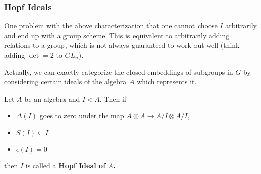 \documentclass[12pt]{article}
\theoremstyle{nonumberbreak}
\theoremstyle{changebreak}
\theoremstyle{nonumberbreak}
\begin{document}
\subsubsection{Hopf Ideals}
One problem with the above characterization that one cannot choose $I$ arbitrarily and end
up with a group scheme. This is equivalent to arbitrarily adding relations to a group, which is
not always guaranteed to work out well (think adding $\det = 2$ to $GL_n$).

Actually, we can exactly categorize the closed embeddings of subgroups in $G$ by considering certain
ideals of the algebra $A$ which represents it. 
\begin{defn}
	Let $A$ be an algebra and $I\lhd A$. Then if 
	\begin{itemize}
		\item $\Delta(I)$ goes to zero under the map $A\otimes A\to A/I\otimes A/I$,
		\item $S(I)\subseteq I$
		\item $\epsilon(I)=0$
	\end{itemize}
	then $I$ is called a \textbf{Hopf Ideal of $A$.}
\end{defn}
\end{document}
